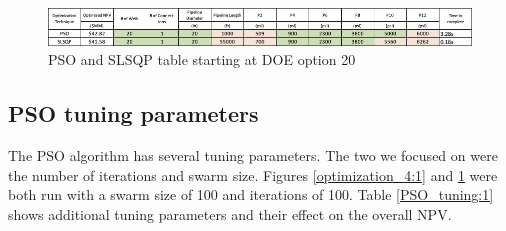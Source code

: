 \documentclass[balance,upint,subscriptcorrection,varvw,mathalfa=cal=boondoxo,spanish,french,vietnamese,russian,greek,pdf-a,colorlinks]{asmeconf}
\begin{document}

\begin{figure}[btp]
\centering\includegraphics[width=0.7\linewidth]{images/optimization_point_20.jpg}
\caption{PSO and SLSQP table starting at DOE option 20}\label{optimization_20:1}
\end{figure}


\subsection*{PSO tuning parameters}
The PSO algorithm has several tuning parameters. The two we focused on were the number of iterations and swarm size. Figures \ref{optimization_4:1} and \ref{optimization_20:1} were both run with a swarm size of 100 and iterations of 100. Table \ref{PSO_tuning:1} shows additional tuning parameters and their effect on the overall NPV. 

\begin{table}[!btp]
\caption[Table]{PSO Tuning}\label{PSO_tuning:1}
\end{table}

 
\end{document}
